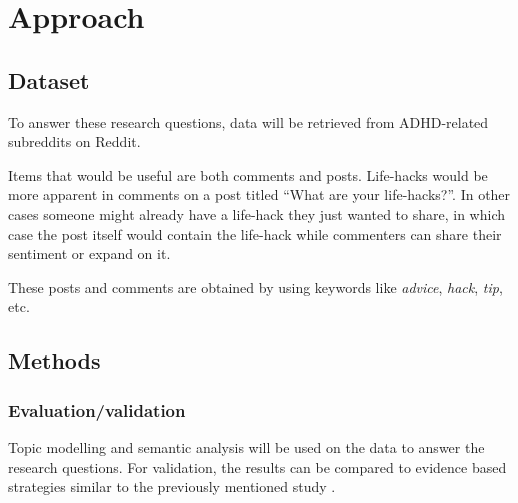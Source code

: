 \section{Approach}
\subsection{Dataset}
To answer these research questions, data will be retrieved from ADHD-related subreddits on Reddit.

Items that would be useful are both comments and posts. Life-hacks would be more apparent in comments on a post titled ``What are your life-hacks?''. In other cases someone might already have a life-hack they just wanted to share, in which case the post itself would contain the life-hack while commenters can share their sentiment or expand on it.

These posts and comments are obtained by using keywords like \textit{advice}, \textit{hack}, \textit{tip}, etc.

\subsection{Methods}
\subsubsection{Evaluation/validation}
Topic modelling and semantic analysis will be used on the data to answer the research questions. For validation, the results can be compared to evidence based strategies similar to the previously mentioned study \cite{scalzo2024using}.
